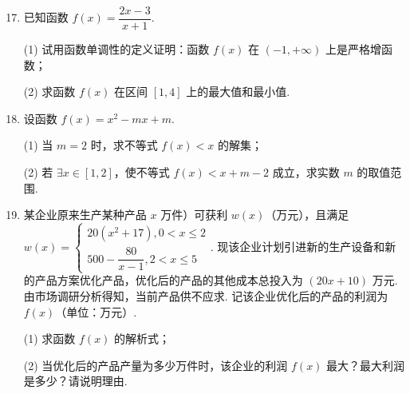 \documentclass[a4paper,11pt]{article}
\begin{document}
\begin{enumerate}
\setcounter{enumi}{16}

\item 已知函数 $f(x)=\dfrac{2x-3}{x+1}$.

(1) 试用函数单调性的定义证明：函数 $f(x)$ 在 $(-1,+\infty)$ 上是严格增函数；

(2) 求函数 $f(x)$ 在区间 $[1,4]$ 上的最大值和最小值.

\ifanswer
\solbegin
{}
\solend
\fi

\item 设函数 $f(x)=x^2-mx+m$.

(1) 当 $m=2$ 时，求不等式 $f(x)<x$ 的解集；

(2) 若 $\exists x\in[1,2]$，使不等式 $f(x)<x+m-2$ 成立，求实数 $m$ 的取值范围.

\ifanswer
\solbegin
{}
\solend
\fi

\item 某企业原来生产某种产品 $x$ 万件）可获利 $w(x)$（万元），且满足\newline%
$w(x)=\begin{cases}20(x^2+17),0<x\leqslant2\\500-\dfrac{80}{x-1},2<x\leqslant5\end{cases}$.
现该企业计划引进新的生产设备和新的产品方案优化产品，优化后的产品的其他成本总投入为 $(20x+10)$ 万元. 由市场调研分析得知，当前产品供不应求. 记该企业优化后的产品的利润为 $f(x)$（单位：万元）.

(1) 求函数 $f(x)$ 的解析式；

(2) 当优化后的产品产量为多少万件时，该企业的利润 $f(x)$ 最大？最大利润是多少？请说明理由.


\end{enumerate}
\end{document}
